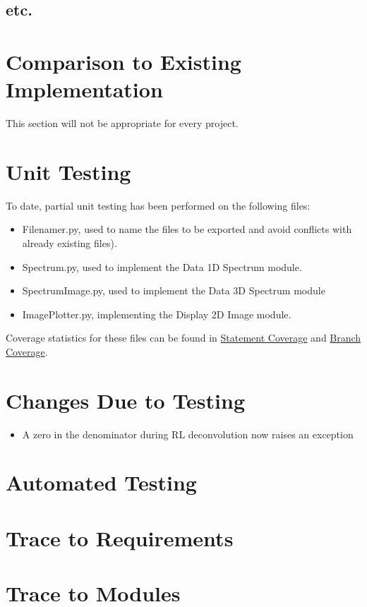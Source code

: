 \documentclass[12pt, titlepage]{article}
\begin{document}
\subsection{etc.}
	
\section{Comparison to Existing Implementation}	

This section will not be appropriate for every project.

\section{Unit Testing}
To date, partial unit testing has been performed on the following files:
\begin{itemize}
    \item Filenamer.py, used to name the files to be exported and avoid conflicts with already existing files).
    \item Spectrum.py, used to implement the Data 1D Spectrum module.
    \item SpectrumImage.py, used to implement the Data 3D Spectrum module
    \item ImagePlotter.py, implementing the Display 2D Image module.
\end{itemize}

Coverage statistics for these files can be found in \hyperref[ssec:StatCov]{Statement Coverage} and \hyperref[ssec:BrCov]{Branch Coverage}.

\section{Changes Due to Testing}
\begin{itemize}
    \item A zero in the denominator during RL deconvolution now raises an exception
\end{itemize}
\section{Automated Testing}
		
\section{Trace to Requirements}
		
\section{Trace to Modules}		
\end{document}
